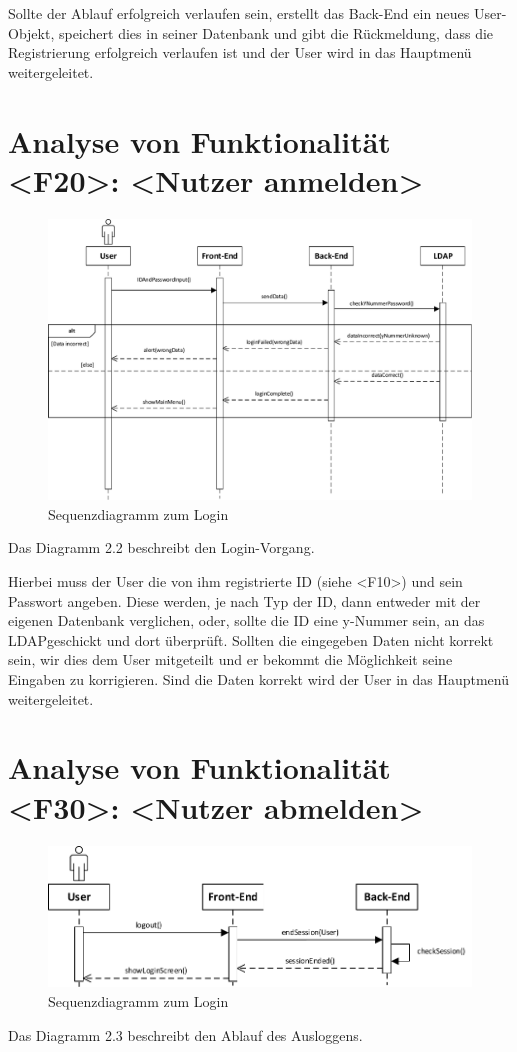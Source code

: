 Sollte der Ablauf erfolgreich verlaufen sein, erstellt das Back-End ein neues User-Objekt, speichert dies in seiner Datenbank und gibt die Rückmeldung, dass die Registrierung erfolgreich verlaufen ist und der User wird in das Hauptmenü weitergeleitet.

\newpage
\section{Analyse von Funktionalität <F20>: <Nutzer anmelden>}
\begin{figure}[h]
\centering
\includegraphics[width=1.3\textwidth]{figures/sequenz_F20.pdf}
\caption{Sequenzdiagramm zum Login}
\label{sequence}
\end{figure}
Das Diagramm 2.2 beschreibt den Login-Vorgang. 

Hierbei muss der User die von ihm registrierte ID (siehe <F10>) und sein Passwort angeben. Diese werden, je nach Typ der ID, dann entweder mit der eigenen Datenbank verglichen, oder, sollte die ID eine y-Nummer sein, an das \glqq LDAP\grqq geschickt und dort überprüft.
Sollten die eingegeben Daten nicht korrekt sein, wir dies dem User mitgeteilt und er bekommt die Möglichkeit seine Eingaben zu korrigieren. Sind die Daten korrekt wird der User in das Hauptmenü weitergeleitet.

\newpage
\section{Analyse von Funktionalität <F30>: <Nutzer abmelden>}
\begin{figure}[h]
\centering
\includegraphics[width=1.4\textwidth]{figures/sequenz_F30.pdf}
\caption{Sequenzdiagramm zum Login}
\label{sequence}
\end{figure}
Das Diagramm 2.3 beschreibt den Ablauf des Ausloggens.

